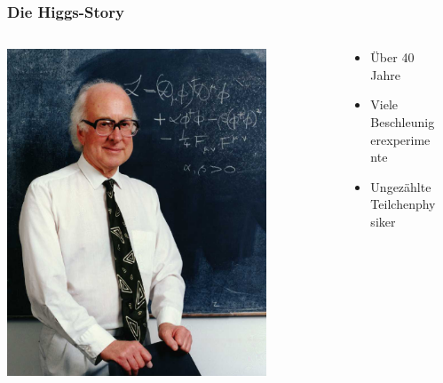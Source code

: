 \documentclass{beamer}
\begin{document}
\begin{frame}
  \frametitle{Die Higgs-Story}
  \vskip-0.2cm
  \begin{columns}[T]
    \begin{column}{0.2\textwidth}
      \centering
      \includegraphics[width=0.8\textwidth]{sm/PeterHiggs.jpg}
    \end{column}
    \begin{column}{0.5\textwidth}
      \begin{itemize}
      \item \"Uber 40 Jahre
      \item<2-> Viele Beschleunigerexperimente
      \item<3-> Ungez\"ahlte Teilchenphysiker
      \end{itemize}
    \end{column}
    \begin{column}{0.3\textwidth}
      \centering
\end{column}
\end{columns}
\end{frame}
\end{document}
